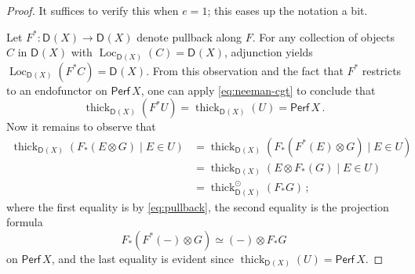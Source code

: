 \documentclass[10pt,a4paper]{amsart}
\newcommand{\Loc}{\operatorname{Loc}}
\newcommand{\cat}[1]{{\mathsf{#1}}}
\newcommand{\dcat}[2][]{\cat{D}_{#1}(#2)}
\newcommand{\perf}[1]{\mathsf{Perf}\,#1}
\newcommand{\thick}{\operatorname{thick}}
\begin{document}
\begin{proof}
It suffices to verify this when $e=1$; this eases up the notation a bit. 

Let $F^*\colon \dcat{X}\to \dcat{X}$ denote pullback along $F$. For any collection of objects $C$ in $\dcat X$ with $\Loc_{\dcat X}(C)=\dcat{X}$, adjunction yields $\Loc_{\dcat X}(F^*C)=\dcat{X}$. From this observation and the fact that $F^*$ restricts to an endofunctor on $\perf{X}$, one can apply \cref{eq:neeman-cgt} to conclude that 
\begin{equation}\label{eq:pullback}
\thick_{\dcat X}(F^*U)=\thick_{\dcat X}(U)=\perf{X}\,.
\end{equation}
Now it remains to observe that 
\begin{align*}
 \thick_{\dcat X}(F _*(E\otimes G)\mid E\in U)&=\thick_{\dcat X}(F _*(F^*(E)\otimes G)\mid E\in U)\\
 &=\thick_{\dcat X}(E\otimes F _*(G)\mid E\in U)\\
 &=\thick^{\odot}_{\dcat X}(F_*G)\,;
\end{align*}
where the first equality is by \cref{eq:pullback}, the second equality is the projection formula
\[
F _*(F ^*(-)\otimes G)\simeq (-)\otimes F _*G
\]
on $\perf{X}$, and the last equality is evident since $\thick_{\dcat X}(U)=\perf{X}$. 
\end{proof}
\end{document}
